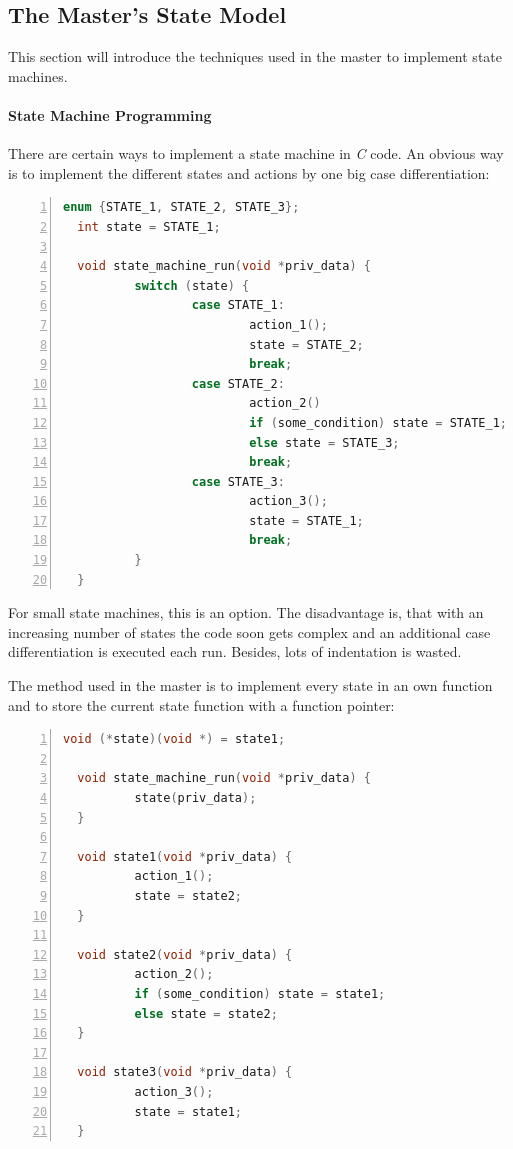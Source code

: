 \documentclass[a4paper,12pt,BCOR6mm,bibtotoc,idxtotoc]{scrbook}
\begin{document}

\subsection{The Master's State Model}
\label{sec:statemodel}

This section will introduce the techniques used in the master to
implement state machines.

\paragraph{State Machine Programming}

There are certain ways to implement a state machine in \textit{C}
code. An obvious way is to implement the different states and actions
by one big case differentiation:

\begin{lstlisting}[language=C,numbers=left]
  enum {STATE_1, STATE_2, STATE_3};
  int state = STATE_1;

  void state_machine_run(void *priv_data) {
          switch (state) {
                  case STATE_1:
                          action_1();
                          state = STATE_2;
                          break;
                  case STATE_2:
                          action_2()
                          if (some_condition) state = STATE_1;
                          else state = STATE_3;
                          break;
                  case STATE_3:
                          action_3();
                          state = STATE_1;
                          break;
          }
  }
\end{lstlisting}

For small state machines, this is an option. The disadvantage is, that
with an increasing number of states the code soon gets complex and an
additional case differentiation is executed each run. Besides, lots of
indentation is wasted.

The method used in the master is to implement every state in an own
function and to store the current state function with a function
pointer:

\begin{lstlisting}[language=C,numbers=left]
  void (*state)(void *) = state1;

  void state_machine_run(void *priv_data) {
          state(priv_data);
  }

  void state1(void *priv_data) {
          action_1();
          state = state2;
  }

  void state2(void *priv_data) {
          action_2();
          if (some_condition) state = state1;
          else state = state2;
  }

  void state3(void *priv_data) {
          action_3();
          state = state1;
  }
\end{lstlisting}
\end{document}
